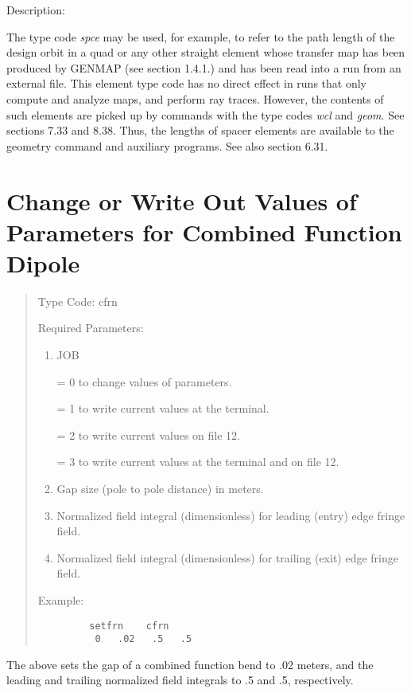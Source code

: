 \vspace{5mm}
     Description:
\vspace{2mm}

     The type code {\em spce } may be used, for example, to refer to the
path length of the design orbit in a quad or any other straight element whose transfer map has been
produced by GENMAP (see section 1.4.1.) and has been read into a \Mary
run from an external file.  This element type code has no direct effect
in \Mary runs that only compute and analyze maps, and perform ray
traces.  However, the contents of such elements are picked up by commands
with the type codes {\em wcl} and {\em geom}.  See sections 7.33 and
8.38.  Thus, the lengths of spacer elements are available to the geometry
command and auxiliary programs.  See also section 6.31.

\newpage

\section{Change or Write Out Values of Parameters
\protect\newline for Combined Function Dipole}
\begin{quotation}
\noindent Type Code:  cfrn
\vspace{5mm}

\noindent Required Parameters:
\begin{enumerate}
    \item  JOB

           = 0 to change values of parameters.

           = 1 to write current values at the terminal.

           = 2 to write current values on file 12.

           = 3 to write current values at the terminal and on file 12.

\item  Gap size (pole to pole distance) in meters.
\item  Normalized field integral (dimensionless) for leading (entry) edge
fringe field.
\item  Normalized field integral (dimensionless) for trailing (exit) edge
fringe field.
\end{enumerate}

\vspace{5mm}
\noindent Example:
\vspace{2mm}
\begin{verbatim}
         setfrn    cfrn
          0   .02   .5   .5
\end{verbatim}
\end{quotation}
The above sets the gap of a combined  function bend to .02 meters, and the leading and trailing normalized
field integrals to .5 and .5, respectively.

